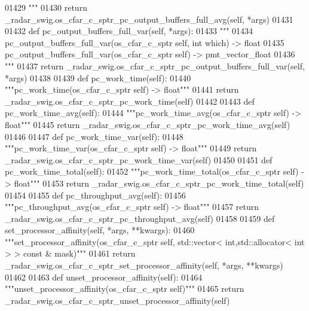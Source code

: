 \begin{DoxyCode}
{{{{{{01429 \textcolor{stringliteral}{        """}
01430         \textcolor{keywordflow}{return} \_radar\_swig.os\_cfar\_c\_sptr\_pc\_output\_buffers\_full\_avg(self, *args)
01431 
01432     \textcolor{keyword}{def }pc_output_buffers_full_var(self, *args):
01433         \textcolor{stringliteral}{"""}
01434 \textcolor{stringliteral}{        pc\_output\_buffers\_full\_var(os\_cfar\_c\_sptr self, int which) -> float}
01435 \textcolor{stringliteral}{        pc\_output\_buffers\_full\_var(os\_cfar\_c\_sptr self) -> pmt\_vector\_float}
01436 \textcolor{stringliteral}{        """}
01437         \textcolor{keywordflow}{return} \_radar\_swig.os\_cfar\_c\_sptr\_pc\_output\_buffers\_full\_var(self, *args)
01438 
01439     \textcolor{keyword}{def }pc_work_time(self):
01440         \textcolor{stringliteral}{"""pc\_work\_time(os\_cfar\_c\_sptr self) -> float"""}
01441         \textcolor{keywordflow}{return} \_radar\_swig.os\_cfar\_c\_sptr\_pc\_work\_time(self)
01442 
01443     \textcolor{keyword}{def }pc_work_time_avg(self):
01444         \textcolor{stringliteral}{"""pc\_work\_time\_avg(os\_cfar\_c\_sptr self) -> float"""}
01445         \textcolor{keywordflow}{return} \_radar\_swig.os\_cfar\_c\_sptr\_pc\_work\_time\_avg(self)
01446 
01447     \textcolor{keyword}{def }pc_work_time_var(self):
01448         \textcolor{stringliteral}{"""pc\_work\_time\_var(os\_cfar\_c\_sptr self) -> float"""}
01449         \textcolor{keywordflow}{return} \_radar\_swig.os\_cfar\_c\_sptr\_pc\_work\_time\_var(self)
01450 
01451     \textcolor{keyword}{def }pc_work_time_total(self):
01452         \textcolor{stringliteral}{"""pc\_work\_time\_total(os\_cfar\_c\_sptr self) -> float"""}
01453         \textcolor{keywordflow}{return} \_radar\_swig.os\_cfar\_c\_sptr\_pc\_work\_time\_total(self)
01454 
01455     \textcolor{keyword}{def }pc_throughput_avg(self):
01456         \textcolor{stringliteral}{"""pc\_throughput\_avg(os\_cfar\_c\_sptr self) -> float"""}
01457         \textcolor{keywordflow}{return} \_radar\_swig.os\_cfar\_c\_sptr\_pc\_throughput\_avg(self)
01458 
01459     \textcolor{keyword}{def }set_processor_affinity(self, *args, **kwargs):
01460         \textcolor{stringliteral}{"""set\_processor\_affinity(os\_cfar\_c\_sptr self, std::vector< int,std::allocator< int > > const &
       mask)"""}
01461         \textcolor{keywordflow}{return} \_radar\_swig.os\_cfar\_c\_sptr\_set\_processor\_affinity(self, *args, **kwargs)
01462 
01463     \textcolor{keyword}{def }unset_processor_affinity(self):
01464         \textcolor{stringliteral}{"""unset\_processor\_affinity(os\_cfar\_c\_sptr self)"""}
01465         \textcolor{keywordflow}{return} \_radar\_swig.os\_cfar\_c\_sptr\_unset\_processor\_affinity(self)
}}}}}}
\end{DoxyCode}
